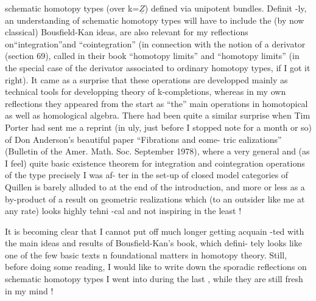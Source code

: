
schematic homotopy types (over k=$\underline{Z}$) defined via unipotent bundles. Definit
-ly, an understanding of schematic homotopy types will have to include the
(by now classical) Bousfield-Kan ideas,   are also relevant for my
reflections on``integration''and ``cointegration'' (in connection with the
notion of a derivator (section 69)\hand{)}, called in their book ``homotopy  
limits'' and ``homotopy   limits'' (in the special case of the derivator
associated to ordinary homotopy types, if I got it right). It came as a
surprise that  these operations are developped  mainly as technical tools
for developping   theory of k-completions, whereas in my own reflections
they appeared from the start as ``the'' main operations in homotopical as
well as homological algebra. There had been quite a similar surprise when
Tim Porter had sent me a reprint (in uly, just before I stopped   note
for a month or so) of Don Anderson's beautiful paper ``Fibrations and eome-
tric ealizations'' (Bulletin of the Amer. Math. Soc. September 1978),
where a very general and (as I feel) quite basic existence theorem for
integration and cointegration operations\hand{,} of the type precisely I was af-
ter\hand{,} in the  set-up of closed model categories of Quillen\hand{,} is barely
alluded to at the end of the introduction, and  
more or less as  a by-product of   a result on geometric
realizations which (to an outsider like me at any rate) looks highly tehni
-cal and not inspiring in the least !

It is becoming clear that I cannot put off much longer getting acquain
-ted with the main ideas and results of Bousfield-Kan's book, which defini-
tely looks like one of the few basic texts n  foundational
matters in homotopy theory. Still, before doing some   reading, I
would like to write down the sporadic reflections on schematic homotopy
types I went into during the last  , while they are still fresh in my
mind !

